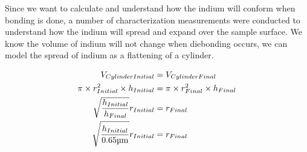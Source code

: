 Since we want to calculate and understand how the indium will conform when bonding is done, a number of characterization measurements were conducted to understand how the indium will spread and expand over the sample surface. We know the volume of indium will not change when diebonding occurs, we can model the spread of indium as a flattening of a cylinder.

\begin{equation} \label{eq:radius_indium}
    \begin{split}
        V_{Cylinder Initial} &= V_{Cylinder Final} \\
        \pi \times r_{Initial}^2 \times h_{Initial} &= \pi \times r_{Final}^2 \times h_{Final} \\
        \sqrt{\frac{h_{Initial}}{h_{Final}}} r_{Initial} &= r_{Final} \\
        \sqrt{\frac{h_{Initial}}{ 0.65 \um}} r_{Initial} &= r_{Final}
    \end{split}
\end{equation}


